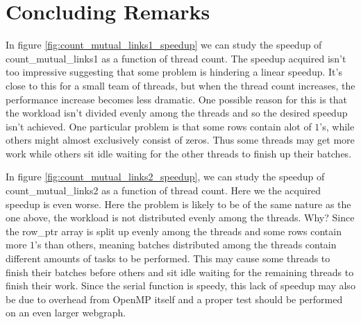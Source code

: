 \documentclass[english,notitlepage, reprint]{revtex4-1}  %
\begin{document}
\section{Concluding Remarks}
In figure \ref{fig:count_mutual_links1_speedup} we can study the speedup of count\_mutual\_links1 as a function of thread count. The speedup acquired isn't too impressive suggesting that some problem is hindering a linear speedup. It's close to this for a small team of threads, but when the thread count increases, the performance increase becomes less dramatic. One possible reason for this is that the workload isn't divided evenly among the threads and so the desired speedup isn't achieved. One particular problem is that some rows contain alot of $1$'s, while others might almost exclusively consist of zeros. Thus some threads may get more work while others sit idle waiting for the other threads to finish up their batches.

In figure \ref{fig:count_mutual_links2_speedup}, we can study the speedup of count\_mutual\_links2 as a function of thread count. Here we the acquired speedup is even worse. Here the problem is likely to be of the same nature as the one above, the workload is not distributed evenly among the threads. Why? Since the row\_ptr array is split up evenly among the threads and some rows contain more $1$'s than others, meaning batches distributed among the threads contain different amounts of tasks to be performed. This may cause some threads to finish their batches before others and sit idle waiting for the remaining threads to finish their work. Since the serial function is speedy, this lack of speedup may also be due to overhead from OpenMP itself and a proper test should be performed on an even larger webgraph.


\onecolumngrid


\end{document}
